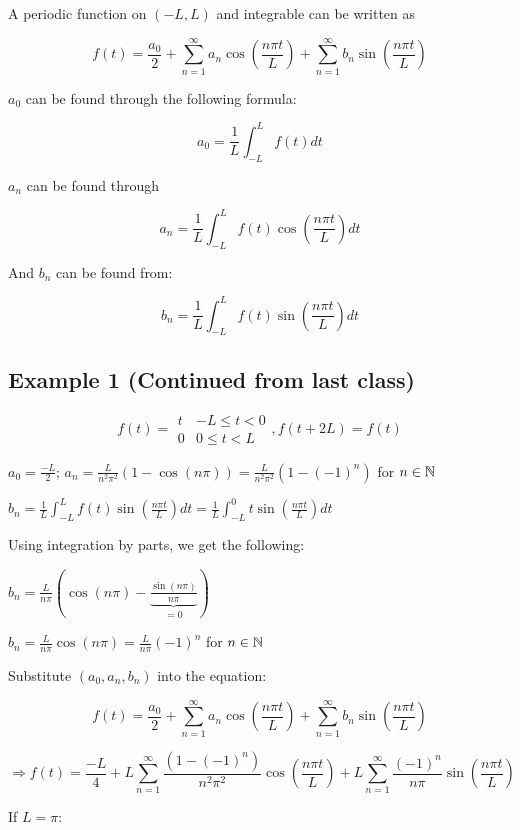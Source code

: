 \documentclass{article}
\begin{document}
A periodic function on $(-L, L)$ and integrable can be written as 

$$f(t) = \frac{a_0}{2} + \sum_{n = 1}^\infty a_n \cos(\frac{n \pi t}{L}) + \sum_{n = 1}^\infty b_n \sin(\frac{n \pi t}{L})$$

$a_0$ can be found through the following formula:

$$a_0 = \frac{1}{L} \int_{-L}^L f(t) dt$$

$a_n$ can be found through

$$a_n = \frac{1}{L} \int_{-L}^{L} f(t) \cos(\frac{n \pi t}{L}) dt$$

And $b_n$ can be found from:

$$b_n = \frac{1}{L} \int_{-L}^L f(t) \sin(\frac{n \pi t}{L}) dt$$

\subsection{Example 1 (Continued from last class)}

$$f(t) = \begin{matrix} t & -L \leq t < 0 \\ 0 & 0 \leq t < L \end{matrix}, f(t + 2L) = f(t)$$

$a_0 = \frac{-L}{2}$; $a_n = \frac{L}{n^2 \pi^2} \left(1 - \cos(n \pi ) \right) = \frac{L}{n^2 \pi^2} \left(1 - (-1)^n \right)$ for $n \in \mathbb{N}$

\hfill

$b_n = \frac{1}{L} \int_{-L}^L f(t) \sin(\frac{n \pi t}{L}) dt =  \frac{1}{L} \int_{-L}^0 t \sin(\frac{n \pi t}{L}) dt$

Using integration by parts, we get the following:

$b_n = \left. \frac{L}{n \pi}\left( \cos(n \pi) - \underbrace{\frac{\sin(n \pi)}{n \pi}}_{ = 0} \right) \right.$

$b_n = \frac{L}{n \pi} \cos(n \pi) = \frac{L}{n \pi} (-1)^n$ for $n \in \mathbb{N}$

Substitute $(a_0, a_n, b_n)$ into the equation: 

$$f(t) = \frac{a_0}{2} + \sum_{n = 1}^\infty a_n \cos(\frac{n \pi t}{L}) + \sum_{n = 1}^\infty b_n \sin(\frac{n \pi t}{L})$$

$$\Rightarrow f(t) = \frac{-L}{4} + L \sum_{n = 1}^\infty \frac{(1 - (-1)^n)}{n^2 \pi^2} \cos(\frac{n \pi t}{L}) +  L \sum_{n = 1}^\infty \frac{(-1)^n}{n \pi} \sin(\frac{n \pi t}{L})$$

If $L = \pi$:
\end{document}
